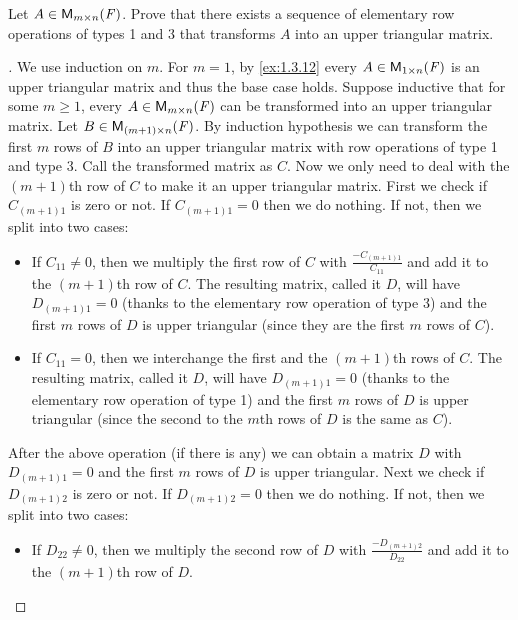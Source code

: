 \begin{ex}\label{ex:3.1.12}
  Let \(A \in \mathsf{M}_{{m} \times n}({\mathit{F}})\).
  Prove that there exists a sequence of elementary row operations of types 1 and 3 that transforms \(A\) into an upper triangular matrix.
\end{ex}

\begin{proof}[]
  We use induction on \(m\).
  For \(m = 1\), by \cref{ex:1.3.12} every \(A \in \mathsf{M}_{{1} \times n}({\mathit{F}})\) is an upper triangular matrix and thus the base case holds.
  Suppose inductive that for some \(m \geq 1\), every \(A \in \mathsf{M}_{{m} \times n}({\mathit{F}})\) can be transformed into an upper triangular matrix.
  Let \(B \in \mathsf{M}_{{(m + 1)} \times n}({\mathit{F}})\).
  By induction hypothesis we can transform the first \(m\) rows of \(B\) into an upper triangular matrix with row operations of type 1 and type 3.
  Call the transformed matrix as \(C\).
  Now we only need to deal with the \((m + 1)\)th row of \(C\) to make it an upper triangular matrix.
  First we check if \(C_{(m + 1) 1}\) is zero or not.
  If \(C_{(m + 1) 1} = 0\) then we do nothing.
  If not, then we split into two cases:
  \begin{itemize}
    \item If \(C_{1 1} \neq 0\), then we multiply the first row of \(C\) with \(\frac{-C_{(m + 1) 1}}{C_{1 1}}\) and add it to the \((m + 1)\)th row of \(C\).
          The resulting matrix, called it \(D\), will have \(D_{(m + 1) 1} = 0\) (thanks to the elementary row operation of type 3) and the first \(m\) rows of \(D\) is upper triangular (since they are the first \(m\) rows of \(C\)).
    \item If \(C_{1 1} = 0\), then we interchange the first and the \((m + 1)\)th rows of \(C\).
          The resulting matrix, called it \(D\), will have \(D_{(m + 1) 1} = 0\) (thanks to the elementary row operation of type 1) and the first \(m\) rows of \(D\) is upper triangular (since the second to the \(m\)th rows of \(D\) is the same as \(C\)).
  \end{itemize}
  After the above operation (if there is any) we can obtain a matrix \(D\) with \(D_{(m + 1) 1} = 0\) and the first \(m\) rows of \(D\) is upper triangular.
  Next we check if \(D_{(m + 1) 2}\) is zero or not.
  If \(D_{(m + 1) 2} = 0\) then we do nothing.
  If not, then we split into two cases:
  \begin{itemize}
    \item If \(D_{2 2} \neq 0\), then we multiply the second row of \(D\) with \(\frac{-D_{(m + 1) 2}}{D_{2 2}}\) and add it to the \((m + 1)\)th row of \(D\).

\end{itemize}
\end{proof}
